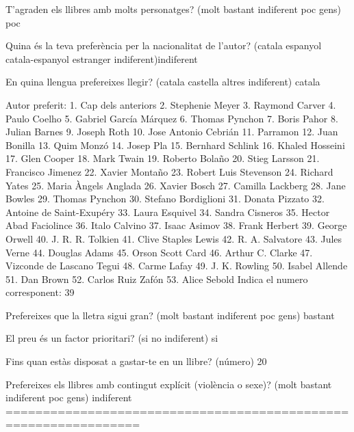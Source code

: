 T'agraden els llibres amb molts personatges? (molt bastant indiferent poc gens) poc

Quina és la teva preferència per la nacionalitat de l'autor? (catala espanyol catala-espanyol estranger indiferent)indiferent

En quina llengua prefereixes llegir? (catala castella altres indiferent) catala

Autor preferit: 
  1. Cap dels anteriors
  2. Stephenie Meyer
  3. Raymond Carver
  4. Paulo Coelho
  5. Gabriel García Márquez
  6. Thomas Pynchon
  7. Boris Pahor
  8. Julian Barnes
  9. Joseph Roth
  10. Jose Antonio Cebrián
  11. Parramon
  12. Juan Bonilla
  13. Quim Monzó
  14. Josep Pla
  15. Bernhard Schlink
  16. Khaled Hosseini
  17. Glen Cooper
  18. Mark Twain
  19. Roberto Bolaño
  20. Stieg Larsson
  21. Francisco Jimenez
  22. Xavier Montaño
  23. Robert Luis Stevenson
  24. Richard Yates
  25. Maria Àngels Anglada
  26. Xavier Bosch
  27. Camilla Lackberg
  28. Jane Bowles
  29. Thomas Pynchon
  30. Stefano Bordiglioni
  31. Donata Pizzato
  32. Antoine de Saint-Exupéry
  33. Laura Esquivel
  34. Sandra Cisneros
  35. Hector Abad Faciolince
  36. Italo Calvino
  37. Isaac Asimov
  38. Frank Herbert
  39. George Orwell
  40. J. R. R. Tolkien
  41. Clive Staples Lewis
  42. R. A. Salvatore
  43. Jules Verne
  44. Douglas Adams
  45. Orson Scott Card
  46. Arthur C. Clarke
  47. Vizconde de Lascano Tegui
  48. Carme Lafay
  49. J. K. Rowling
  50. Isabel Allende
  51. Dan Brown
  52. Carlos Ruiz Zafón
  53. Alice Sebold
Indica el numero corresponent: 39

Prefereixes que la lletra sigui gran? (molt bastant indiferent poc gens) bastant

El preu és un factor prioritari? (si no indiferent) si

Fins quan estàs disposat a gastar-te en un llibre? (número) 20

Prefereixes els llibres amb contingut explícit (violència o sexe)? (molt bastant indiferent poc gens) indiferent
================================================================

